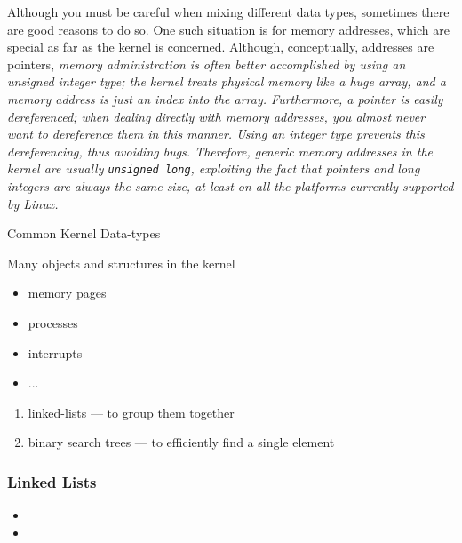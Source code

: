 Although you must be careful when mixing different data types, sometimes there are good
reasons to do so. One such situation is for memory addresses, which are special as far as
the kernel is concerned. Although, conceptually, addresses are pointers, \emph{memory
administration is often better accomplished by using an unsigned integer type; the
  kernel treats physical memory like a huge array, and a memory address is just an index
  into the array. Furthermore, a pointer is easily dereferenced; when dealing directly
with memory addresses, you almost never want to dereference them in this manner. Using an
integer type prevents this dereferencing, thus avoiding bugs.  Therefore, generic
  memory addresses in the kernel are usually \texttt{unsigned long}, exploiting the fact
  that pointers and long integers are always the same size, at least on all the platforms
  currently supported by Linux.} 

\begin{frame}{Common Kernel Data-types}
  \begin{block}{Many objects and structures in the kernel}
    \begin{itemize}
    \item memory pages
    \item processes
    \item interrupts
    \item ...
    \end{itemize}
    \begin{enumerate}
    \item linked-lists --- to group them together
    \item binary search trees --- to efficiently find a single element
    \end{enumerate}
  \end{block}
\end{frame}

\subsubsection{Linked Lists}

\begin{itemize}
\item {} 
\item {}
\end{itemize}

